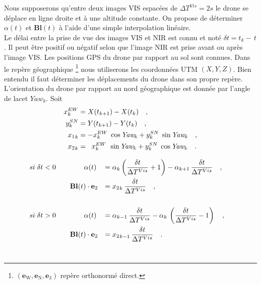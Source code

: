\documentclass[a4paper,11pt]{report}
\begin{document}
Nous supposerons qu'entre deux images VIS espacées de $\Delta T^{Vis} =2s$ le drone se déplace en ligne droite et à une altitude constante.
On propose de déterminer $\alpha(t)$ et $\mathbf{Bl}(t)$ à l'aide d'une simple interpolation linéaire.\\

Le délai entre la prise de vue des images VIS et NIR est connu et noté $\delta t= t_k -\,t$ . 
Il peut être positif ou négatif selon que l'image NIR est prise avant ou après l'image VIS. 
Les positions GPS du drone par rapport au sol sont connues.  
Dans le repère géographique 
\footnote{$(\mathbf{e}_{\mathrm{W}}, \mathbf{e}_{\mathrm{N}}, \mathbf{e}_3)$ repère orthonormé direct.}
nous utiliserons les coordonnées UTM $(X, Y, Z)$. Bien entendu il faut déterminer les déplacements du drone dans son propre repère. L'orientation du drone par rapport au nord géographique est donnée par l'angle de lacet $\textit{Yaw}_k$. Soit\\ 
\begin{equation}
	\label{Theoritical_Pitch_non_syncho_11}
	\begin{aligned}
		{x}^{EW}_k&=X(t_{k+1})-X(t_{k}) \quad,\\
		{y}^{SN}_k&=Y(t_{k+1})-Y(t_{k}) \quad,\\
		{x_1}_k&=-{x}^{EW}_k\; \cos \textit{Yaw}_k + {y}^{SN}_k\; \sin \textit{Yaw}_k \quad,\\
		{x_2}_k&=\;\;{x}^{EW}_k\:\: \sin \textit{Yaw}_k + {y}^{SN}_k\; \cos \textit{Yaw}_k  \quad.\\
	\end{aligned} \\
\end{equation}


\begin{equation}
	\label{Theoritical_Pitch_non_syncho_1}
	\begin{aligned}
		si \;\delta t <0 \qquad& \qquad\alpha(t)&=&\;\alpha_k \left(\frac{\delta t}{ \Delta T^{Vis} }+1\right) - \alpha_{k+1}\,\frac{\delta t}{ \Delta T^{Vis}} \quad,\\
		&\mathbf{Bl}(t) \cdot \mathbf{e}_2&=&\; {x_2}_k\,\frac{\delta t}{ \Delta T^{Vis}} \quad,&\\
		&&&\\
		si \;\delta t >0 \qquad &\qquad \alpha(t)&=&\;\alpha_{k-1} \,\frac{\delta t}{ \Delta T^{Vis}}- \alpha_k\, \left(\frac{\delta t}{ \Delta T^{Vis} }-1\right)  \quad,\\
		&\mathbf{Bl}(t) \cdot \mathbf{e}_2&=&\; {x_2}_{k-1}\,\frac{\delta t}{ \Delta T^{Vis}} \quad.&\\
	\end{aligned} \\
\end{equation}\\
\end{document}
